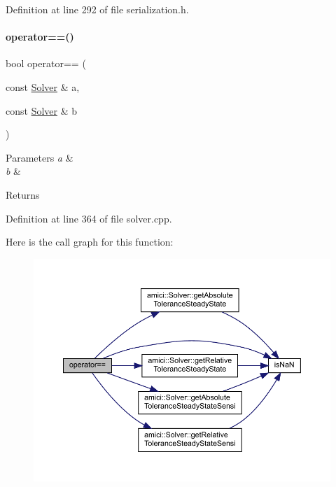 Definition at line 292 of file serialization.\+h.

\mbox{\label{namespaceamici_a252a116a8f94abccc25b2086deb0734b}} 
\paragraph{\texorpdfstring{operator==()}{operator==()}\hspace{0.1cm}{\footnotesize\ttfamily [2/2]}}
{\footnotesize\ttfamily bool operator== (\begin{DoxyParamCaption}\item[{const \mbox{\hyperlink{classamici_1_1_solver}{Solver}} \&}]{a,  }\item[{const \mbox{\hyperlink{classamici_1_1_solver}{Solver}} \&}]{b }\end{DoxyParamCaption})}


\begin{DoxyParams}{Parameters}
{\em a} & \\
\hline
{\em b} & \\
\hline
\end{DoxyParams}
\begin{DoxyReturn}{Returns}

\end{DoxyReturn}


Definition at line 364 of file solver.\+cpp.

Here is the call graph for this function\+:
\nopagebreak
\begin{figure}[H]
\begin{center}
\leavevmode
\includegraphics[width=350pt]{namespaceamici_a252a116a8f94abccc25b2086deb0734b_cgraph}
\end{center}
\end{figure}
\mbox{\label{namespaceamici_aa6801bbdb0c7625719c019ac287be29e}} 
